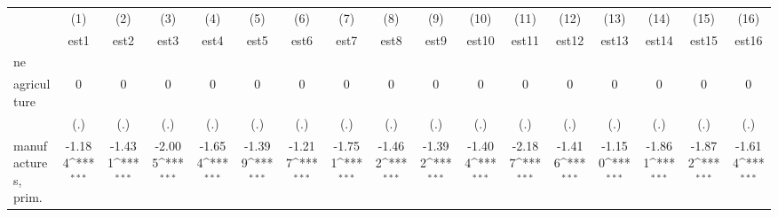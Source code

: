 {
\def\sym#1{\ifmmode^{#1}\else\(^{#1}\)\fi}
\begin{tabular}{l*{16}{c}}
\hline\hline
                    &\multicolumn{1}{c}{(1)}&\multicolumn{1}{c}{(2)}&\multicolumn{1}{c}{(3)}&\multicolumn{1}{c}{(4)}&\multicolumn{1}{c}{(5)}&\multicolumn{1}{c}{(6)}&\multicolumn{1}{c}{(7)}&\multicolumn{1}{c}{(8)}&\multicolumn{1}{c}{(9)}&\multicolumn{1}{c}{(10)}&\multicolumn{1}{c}{(11)}&\multicolumn{1}{c}{(12)}&\multicolumn{1}{c}{(13)}&\multicolumn{1}{c}{(14)}&\multicolumn{1}{c}{(15)}&\multicolumn{1}{c}{(16)}\\
                    &\multicolumn{1}{c}{est1}&\multicolumn{1}{c}{est2}&\multicolumn{1}{c}{est3}&\multicolumn{1}{c}{est4}&\multicolumn{1}{c}{est5}&\multicolumn{1}{c}{est6}&\multicolumn{1}{c}{est7}&\multicolumn{1}{c}{est8}&\multicolumn{1}{c}{est9}&\multicolumn{1}{c}{est10}&\multicolumn{1}{c}{est11}&\multicolumn{1}{c}{est12}&\multicolumn{1}{c}{est13}&\multicolumn{1}{c}{est14}&\multicolumn{1}{c}{est15}&\multicolumn{1}{c}{est16}\\
\hline
ne                  &                     &                     &                     &                     &                     &                     &                     &                     &                     &                     &                     &                     &                     &                     &                     &                     \\
agriculture         &           0         &           0         &           0         &           0         &           0         &           0         &           0         &           0         &           0         &           0         &           0         &           0         &           0         &           0         &           0         &           0         \\
                    &         (.)         &         (.)         &         (.)         &         (.)         &         (.)         &         (.)         &         (.)         &         (.)         &         (.)         &         (.)         &         (.)         &         (.)         &         (.)         &         (.)         &         (.)         &         (.)         \\
[1em]
manufactures, prim. &      -1.184\sym{***}&      -1.431\sym{***}&      -2.005\sym{***}&      -1.654\sym{***}&      -1.399\sym{***}&      -1.217\sym{***}&      -1.751\sym{***}&      -1.462\sym{***}&      -1.392\sym{***}&      -1.404\sym{***}&      -2.187\sym{***}&      -1.416\sym{***}&      -1.150\sym{***}&      -1.861\sym{***}&      -1.872\sym{***}&      -1.614\sym{***}\\

\end{tabular}}
